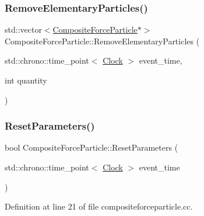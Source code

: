 \mbox{\label{class_composite_force_particle_a032f7d935062f40c798841b2c2f81f98}} 
\subsubsection{\texorpdfstring{Remove\+Elementary\+Particles()}{RemoveElementaryParticles()}}
{\footnotesize\ttfamily std\+::vector$<$\mbox{\hyperlink{class_composite_force_particle}{Composite\+Force\+Particle}}$\ast$$>$ Composite\+Force\+Particle\+::\+Remove\+Elementary\+Particles (\begin{DoxyParamCaption}\item[{std\+::chrono\+::time\+\_\+point$<$ \mbox{\hyperlink{universe_8h_a0ef8d951d1ca5ab3cfaf7ab4c7a6fd80}{Clock}} $>$}]{event\+\_\+time,  }\item[{int}]{quantity }\end{DoxyParamCaption})}

\mbox{\label{class_composite_force_particle_ab4767179e32f6d2b4b31941dd3c48b10}} 
\subsubsection{\texorpdfstring{Reset\+Parameters()}{ResetParameters()}}
{\footnotesize\ttfamily bool Composite\+Force\+Particle\+::\+Reset\+Parameters (\begin{DoxyParamCaption}\item[{std\+::chrono\+::time\+\_\+point$<$ \mbox{\hyperlink{universe_8h_a0ef8d951d1ca5ab3cfaf7ab4c7a6fd80}{Clock}} $>$}]{event\+\_\+time }\end{DoxyParamCaption})}



Definition at line 21 of file compositeforceparticle.\+cc.

